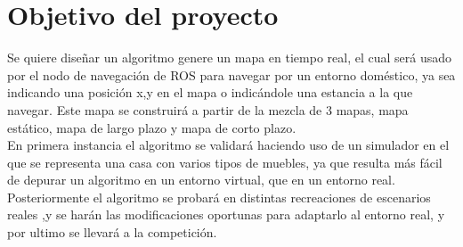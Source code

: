 
\section{Objetivo del proyecto}
\label{sec:objetivos}

Se quiere diseñar un algoritmo genere un mapa en tiempo real, el cual será usado por el nodo de navegación de ROS para navegar por un entorno doméstico, ya sea indicando una posición x,y en el mapa o indicándole una estancia a la que navegar. Este mapa se construirá a partir de la mezcla de 3 mapas, mapa estático, mapa de largo plazo y mapa de corto plazo.\\
En primera instancia el algoritmo se validará haciendo uso de un simulador en el que se representa una casa con varios tipos de muebles, ya que resulta más fácil de depurar un algoritmo en un entorno virtual, que en un entorno real. Posteriormente el algoritmo se probará en distintas recreaciones de escenarios reales ,y se harán las modificaciones oportunas para adaptarlo al entorno real, y por ultimo se llevará a la competición.\\

